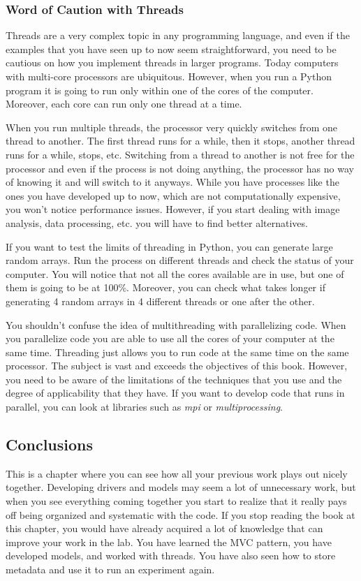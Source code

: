 \subsubsection{Word of Caution with Threads}\label{word-of-caution-withthreads}

Threads are a very complex topic in any programming language, and even
if the examples that you have seen up to now seem straightforward, you
need to be cautious on how you implement threads in larger programs.
Today computers with multi-core processors are ubiquitous. However, when
you run a Python program it is going to run only within one of the cores
of the computer. Moreover, each core can run only one thread at a time.

When you run multiple threads, the processor very quickly switches from
one thread to another. The first thread runs for a while, then it stops,
another thread runs for a while, stops, etc. Switching from a thread to
another is not free for the processor and even if the process is not
doing anything, the processor has no way of knowing it and will switch
to it anyways. While you have processes like the ones you have developed
up to now, which are not computationally expensive, you won't notice
performance issues. However, if you start dealing with image analysis,
data processing, etc. you will have to find better alternatives.

If you want to test the limits of threading in Python, you can generate
large random arrays. Run the process on different threads and check the
status of your computer. You will notice that not all the cores
available are in use, but one of them is going to be at 100\%. Moreover,
you can check what takes longer if generating 4 random arrays in 4
different threads or one after the other.

You shouldn't confuse the idea of multithreading with parallelizing
code. When you parallelize code you are able to use all the cores of
your computer at the same time. Threading just allows you to run code at
the same time on the same processor. The subject is vast and exceeds the
objectives of this book. However, you need to be aware of the
limitations of the techniques that you use and the degree of
applicability that they have. If you want to develop code that runs in
parallel, you can look at libraries such as \emph{mpi} or
\emph{multiprocessing}.

\subsection{Conclusions}\label{conclusions}
This is a chapter where you can see how all your previous work plays out
nicely together. Developing drivers and models may seem a lot of
unnecessary work, but when you see everything coming together you start
to realize that it really pays off being organized and systematic with
the code. If you stop reading the book at this chapter, you would have
already acquired a lot of knowledge that can improve your work in the
lab. You have learned the {MVC} pattern, you have developed models, and
worked with threads. You have also seen how to store metadata and use it
to run an experiment again.

